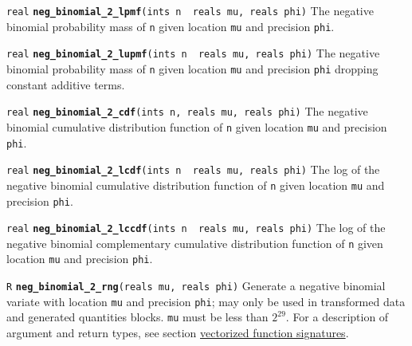 \documentclass[
  10pt,
]{book}
\begin{document}

\texttt{real} \textbf{\texttt{neg\_binomial\_2\_lpmf}}\texttt{(ints\ n\ \textbar{}\ reals\ mu,\ reals\ phi)}\newline
The negative binomial probability mass of \texttt{n} given location \texttt{mu} and
precision \texttt{phi}.


\texttt{real} \textbf{\texttt{neg\_binomial\_2\_lupmf}}\texttt{(ints\ n\ \textbar{}\ reals\ mu,\ reals\ phi)}\newline
The negative binomial probability mass of \texttt{n} given location \texttt{mu} and
precision \texttt{phi} dropping constant additive terms.


\texttt{real} \textbf{\texttt{neg\_binomial\_2\_cdf}}\texttt{(ints\ n,\ reals\ mu,\ reals\ phi)}\newline
The negative binomial cumulative distribution function of \texttt{n} given
location \texttt{mu} and precision \texttt{phi}.


\texttt{real} \textbf{\texttt{neg\_binomial\_2\_lcdf}}\texttt{(ints\ n\ \textbar{}\ reals\ mu,\ reals\ phi)}\newline
The log of the negative binomial cumulative distribution function of \texttt{n}
given location \texttt{mu} and precision \texttt{phi}.


\texttt{real} \textbf{\texttt{neg\_binomial\_2\_lccdf}}\texttt{(ints\ n\ \textbar{}\ reals\ mu,\ reals\ phi)}\newline
The log of the negative binomial complementary cumulative distribution
function of \texttt{n} given location \texttt{mu} and precision \texttt{phi}.


\texttt{R} \textbf{\texttt{neg\_binomial\_2\_rng}}\texttt{(reals\ mu,\ reals\ phi)}\newline
Generate a negative binomial variate with location \texttt{mu} and precision
\texttt{phi}; may only be used in transformed data and generated quantities blocks. \texttt{mu}
must be less than \(2 ^ {29}\). For a description of argument and return types, see
section \protect\hyperlink{prob-vectorization}{vectorized function signatures}.
\end{document}
